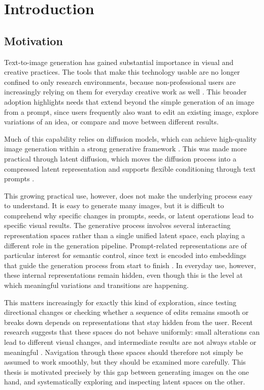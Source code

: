 \chapter{Introduction}\label{ch:intro}

\section{Motivation}\label{sec:1.1}

Text-to-image generation has gained substantial importance in visual and creative practices. The tools that make this technology usable are no longer confined to only research environments, because non-professional users are increasingly relying on them for everyday creative work as well \cite{tang2024democratizing}. This broader adoption highlights needs that extend beyond the simple generation of an image from a prompt, since users frequently also want to edit an existing image, explore variations of an idea, or compare and move between different results.

Much of this capability relies on diffusion models, which can achieve high-quality image generation within a strong generative framework \cite{ho2020denoising}. This was made more practical through latent diffusion, which moves the diffusion process into a compressed latent representation and supports flexible conditioning through text prompts \cite{rombach2022latent}.

This growing practical use, however, does not make the underlying process easy to understand. It is easy to generate many images, but it is difficult to comprehend why specific changes in prompts, seeds, or latent operations lead to specific visual results. The generative process involves several interacting representation spaces rather than a single unified latent space, each playing a different role in the generation pipeline. Prompt-related representations are of particular interest for semantic control, since text is encoded into embeddings that guide the generation process from start to finish \cite{radford2021clip,rombach2022latent}. In everyday use, however, these internal representations remain hidden, even though this is the level at which meaningful variations and transitions are happening.

This matters increasingly for exactly this kind of exploration, since testing directional changes or checking whether a sequence of edits remains smooth or breaks down depends on representations that stay hidden from the user. Recent research suggests that these spaces do not behave uniformly: small alterations can lead to different visual changes, and intermediate results are not always stable or meaningful \cite{samuel2023normguided,park2023riemannian}. Navigation through these spaces should therefore not simply be assumed to work smoothly, but they should be examined more carefully. This thesis is motivated precisely by this gap between generating images on the one hand, and systematically exploring and inspecting latent spaces on the other.

